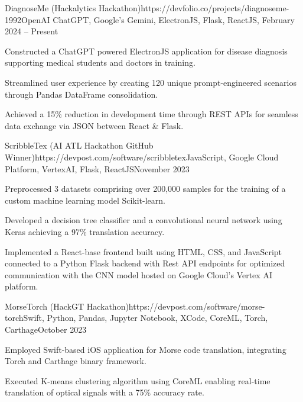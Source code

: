 \documentclass{article}
\begin{document}
\begin{flushleft}
    \begin{project}{DiagnoseMe (Hackalytics Hackathon)}{https://devfolio.co/projects/diagnoseme-1992}{OpenAI ChatGPT, Google's Gemini, ElectronJS, Flask, ReactJS, }{February 2024 -- Present}
        \item Constructed a ChatGPT powered ElectronJS application for disease diagnosis supporting medical students and doctors in training.
        \item Streamlined user experience by creating 120 unique prompt-engineered scenarios through Pandas DataFrame consolidation.
        \item Achieved a 15\% reduction in development time through REST APIs for seamless data exchange via JSON between React \& Flask.
    \end{project}

    \begin{project}{ScribbleTex (AI ATL Hackathon GitHub Winner)}{https://devpost.com/software/scribbletex}{JavaScript, Google Cloud Platform, VertexAI, Flask, ReactJS}{November 2023}
        \item Preprocessed 3 datasets comprising over 200,000 samples for the training of a custom machine learning model Scikit-learn.
        \item Developed a decision tree classifier and a convolutional neural network using Keras achieving a 97\% translation accuracy.
        \item Implemented a React-base frontend built using HTML, CSS, and JavaScript connected to a Python Flask backend with Rest API endpoints for optimized communication with the CNN model hosted on Google Cloud's Vertex AI platform.
    \end{project}

    \begin{project}{MorseTorch (HackGT Hackathon)}{https://devpost.com/software/morse-torch}{Swift, Python, Pandas, Jupyter Notebook, XCode, CoreML, Torch, Carthage}{October 2023}
        \item Employed Swift-based iOS application for Morse code translation, integrating Torch and Carthage binary framework.
        \item Executed K-means clustering algorithm using CoreML enabling real-time translation of optical signals with a 75\% accuracy rate.
        
    \end{project}



\end{flushleft}
\end{document}
